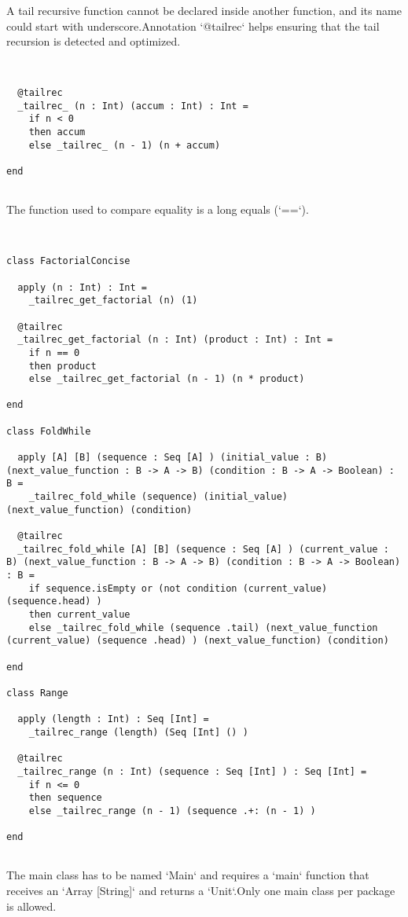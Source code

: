 \documentclass[12pt,a4paper]{article}
\begin{document}
A tail recursive function cannot be declared inside another function, and its name could start with underscore.Annotation `@tailrec` helps ensuring that the tail recursion is detected and optimized. 


\begin{lstlisting}


  @tailrec
  _tailrec_ (n : Int) (accum : Int) : Int =
    if n < 0
    then accum
    else _tailrec_ (n - 1) (n + accum)

end


\end{lstlisting}

The function used to compare equality is a long equals (`==`). 


\begin{lstlisting}


class FactorialConcise

  apply (n : Int) : Int =
    _tailrec_get_factorial (n) (1)

  @tailrec
  _tailrec_get_factorial (n : Int) (product : Int) : Int =
    if n == 0
    then product
    else _tailrec_get_factorial (n - 1) (n * product)

end

class FoldWhile

  apply [A] [B] (sequence : Seq [A] ) (initial_value : B) (next_value_function : B -> A -> B) (condition : B -> A -> Boolean) : B =
    _tailrec_fold_while (sequence) (initial_value) (next_value_function) (condition)

  @tailrec
  _tailrec_fold_while [A] [B] (sequence : Seq [A] ) (current_value : B) (next_value_function : B -> A -> B) (condition : B -> A -> Boolean) : B =
    if sequence.isEmpty or (not condition (current_value) (sequence.head) )
    then current_value
    else _tailrec_fold_while (sequence .tail) (next_value_function (current_value) (sequence .head) ) (next_value_function) (condition)

end

class Range

  apply (length : Int) : Seq [Int] =
    _tailrec_range (length) (Seq [Int] () )

  @tailrec
  _tailrec_range (n : Int) (sequence : Seq [Int] ) : Seq [Int] =
    if n <= 0
    then sequence
    else _tailrec_range (n - 1) (sequence .+: (n - 1) )

end


\end{lstlisting}

The main class has to be named `Main` and requires a `main` function that receives an `Array [String]` and returns a `Unit`.Only one main class per package is allowed. 
\end{document}
